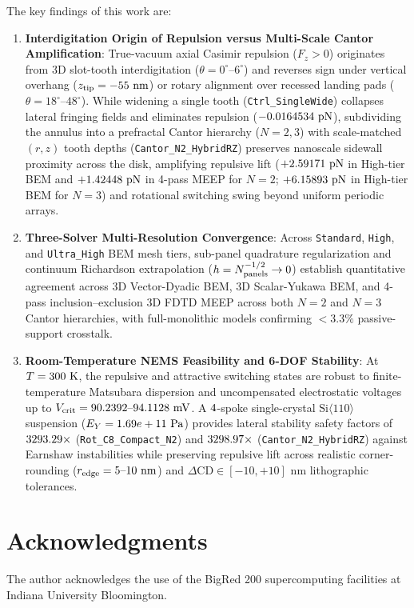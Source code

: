 \documentclass[11pt,letterpaper]{article}
\begin{document}
The key findings of this work are:
\begin{enumerate}
    \item \textbf{Interdigitation Origin of Repulsion versus Multi-Scale Cantor Amplification}: True-vacuum axial Casimir repulsion ($F_z > 0$) originates from 3D slot-tooth interdigitation ($\theta=0^\circ\text{--}6^\circ$) and reverses sign under vertical overhang ($z_{\rm tip} = -55\text{ nm}$) or rotary alignment over recessed landing pads ($\theta=18^\circ\text{--}48^\circ$). While widening a single tooth (\texttt{Ctrl\_SingleWide}) collapses lateral fringing fields and eliminates repulsion ($-0.0164534{}\text{ pN}$), subdividing the annulus into a prefractal Cantor hierarchy ($N=2, 3$) with scale-matched $(r,z)$ tooth depths (\texttt{Cantor\_N2\_HybridRZ}) preserves nanoscale sidewall proximity across the disk, amplifying repulsive lift ($+2.59171{}\text{ pN}$ in High-tier BEM and $+1.42448{}\text{ pN}$ in 4-pass MEEP for $N=2$; $+6.15893{}\text{ pN}$ in High-tier BEM for $N=3$) and rotational switching swing beyond uniform periodic arrays.
    \item \textbf{Three-Solver Multi-Resolution Convergence}: Across \texttt{Standard}, \texttt{High}, and \texttt{Ultra\_High} BEM mesh tiers, sub-panel quadrature regularization and continuum Richardson extrapolation ($h = N_{\rm panels}^{-1/2} \to 0$) establish quantitative agreement across 3D Vector-Dyadic BEM, 3D Scalar-Yukawa BEM, and 4-pass inclusion--exclusion 3D FDTD MEEP across both $N=2$ and $N=3$ Cantor hierarchies, with full-monolithic models confirming $<3.3\%$ passive-support crosstalk.
    \item \textbf{Room-Temperature NEMS Feasibility and 6-DOF Stability}: At $T = 300{}\text{ K}$, the repulsive and attractive switching states are robust to finite-temperature Matsubara dispersion and uncompensated electrostatic voltages up to $V_{\rm crit} = 90.2392{}\text{--}94.1128{}\text{ mV}$. A $4{}$-spoke single-crystal $\text{Si}\langle 110\rangle$ suspension ($E_Y = 1.69e+11{}\text{ Pa}$) provides lateral stability safety factors of $3293.29{}\times$ (\texttt{Rot\_C8\_Compact\_N2}) and $3298.97{}\times$ (\texttt{Cantor\_N2\_HybridRZ}) against Earnshaw instabilities while preserving repulsive lift across realistic corner-rounding ($r_{\rm edge}=5\text{--}10\text{ nm}$) and $\Delta\text{CD} \in [-10, +10]\text{ nm}$ lithographic tolerances.
\end{enumerate}

\section*{Acknowledgments}
The author acknowledges the use of the BigRed 200 supercomputing facilities at Indiana University Bloomington.



\end{document}
